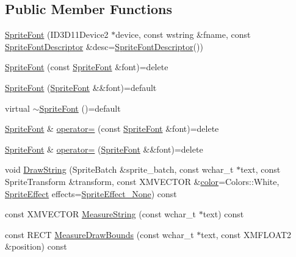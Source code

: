 \subsection*{Public Member Functions}
\begin{DoxyCompactItemize}
\item 
\hyperlink{classmage_1_1_sprite_font_ae9aaa257b25968d4681140c1594fc334}{Sprite\+Font} (I\+D3\+D11\+Device2 $\ast$device, const wstring \&fname, const \hyperlink{structmage_1_1_sprite_font_descriptor}{Sprite\+Font\+Descriptor} \&desc=\hyperlink{structmage_1_1_sprite_font_descriptor}{Sprite\+Font\+Descriptor}())
\item 
\hyperlink{classmage_1_1_sprite_font_a5df751fe06abda25127fdd9222e41948}{Sprite\+Font} (const \hyperlink{classmage_1_1_sprite_font}{Sprite\+Font} \&font)=delete
\item 
\hyperlink{classmage_1_1_sprite_font_ad04b6470c6cf226703c0bb6ccb5dc31a}{Sprite\+Font} (\hyperlink{classmage_1_1_sprite_font}{Sprite\+Font} \&\&font)=default
\item 
virtual \hyperlink{classmage_1_1_sprite_font_a76c98e19f7fccb59d55e1995cfc2356a}{$\sim$\+Sprite\+Font} ()=default
\item 
\hyperlink{classmage_1_1_sprite_font}{Sprite\+Font} \& \hyperlink{classmage_1_1_sprite_font_a3f95359a336adc87088eefe3103a770b}{operator=} (const \hyperlink{classmage_1_1_sprite_font}{Sprite\+Font} \&font)=delete
\item 
\hyperlink{classmage_1_1_sprite_font}{Sprite\+Font} \& \hyperlink{classmage_1_1_sprite_font_ab00b7f5c2740faf52ea778d94ae704bd}{operator=} (\hyperlink{classmage_1_1_sprite_font}{Sprite\+Font} \&\&font)=delete
\item 
void \hyperlink{classmage_1_1_sprite_font_aafbc3398a564f7f521af0be2b4deedc1}{Draw\+String} (Sprite\+Batch \&sprite\+\_\+batch, const wchar\+\_\+t $\ast$text, const Sprite\+Transform \&transform, const X\+M\+V\+E\+C\+T\+OR \&\hyperlink{namespacemage_a56eceea5a9bceb2b56073f3ea4945781}{color}=Colors\+::\+White, \hyperlink{namespacemage_a9cfe18123066ba4236f548f9de75d881}{Sprite\+Effect} effects=\hyperlink{namespacemage_a9cfe18123066ba4236f548f9de75d881af3c275fbfacfe174da928b2f24dfa515}{Sprite\+Effect\+\_\+\+None}) const
\item 
const X\+M\+V\+E\+C\+T\+OR \hyperlink{classmage_1_1_sprite_font_ac4bb785adb3b2c41734523bf9af36723}{Measure\+String} (const wchar\+\_\+t $\ast$text) const
\item 
const R\+E\+CT \hyperlink{classmage_1_1_sprite_font_a45790ee2621c2f1face455a9525be90a}{Measure\+Draw\+Bounds} (const wchar\+\_\+t $\ast$text, const X\+M\+F\+L\+O\+A\+T2 \&position) const

\end{DoxyCompactItemize}
